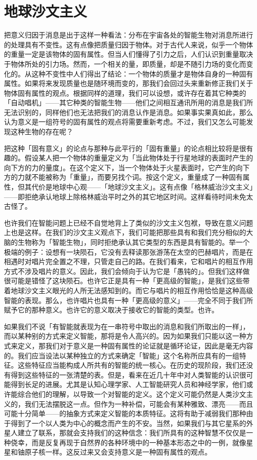 \documentclass[
  12pt,
  twoside,
  openright,
  oldfontcommands,
]{memoir}
\begin{document}
\section{地球沙文主义}

把意义归因于消息是出于这样一种看法：分布在宇宙各处的智能生物对消息所进行的处理具有不变性。这有点像把质量归因于物体。对于古代人来说，似乎一个物体的重量一定是该物体的固有属性。但当人们懂得了引力之后，人们认识到重量取决于物体所处的引力场。然而，一个相关的量，即质量，却是不随引力场的变化而变化的。从这种不变性中人们得出了结论：一个物体的质量才是物体自身的一种固有属性。如果将来发现质量也是随环境而变的，那我们会回过头来重新修正我们关于物体固有属性的观点。根据同样的道理，我们可以设想，或许存在着其它种类的「自动唱机」------其它种类的智能生物------他们之间相互通讯所用的消息是我们所无法识别的，同样他们也无法把我们的消息认作是消息。如果事实果真如此，那么认为意义是一组符号的固有属性的观点将需要重新考虑。不过，我们又怎么可能发现这种生物的存在呢？

把这种「固有意义」的论点与那种与此平行的「固有重量」的论点相比较将是很有趣的。假设某人把一个物体的重量定义为「当此物体处于行星地球的表面时产生的向下方的力的量度」。在这个定义下，当一个物体处于火星表面时，它产生的向下方的力就不能被称为「重量」，而要另找个词。按这个定义，重量成了一种固有属性，但其代价是地球中心观------「地球沙文主义」。这有点像「格林威治沙文主义」------即拒绝承认地球上除格林威治平时之外的其它地区时间。这样看待时间未免太古怪了。

也许我们在智能问题上已经不自觉地背上了类似的沙文主义包袱，导致在意义问题上也是这样。在我们的沙文主义观点下，我们可能把那些具有和我们充分相似的大脑的生物称为「智能生物」，同时拒绝承认其它类型的东西是具有智能的。举一个极端的例子：设想有一块陨石，它没有去释读那张游荡在太空的巴赫唱片，而是在相遇时对唱片完全置之不理，只管走自己的路。在我们看来，它和唱片的相互作用方式不涉及唱片的意义。因此，我们会倾向于认为它是「愚钝的」。但我们这样做很可能是错怪了这块陨石。也许它正是具有一种「更高级的智能」，是我们这些带着地球沙文主义眼光的人所无法感知到的。而它与唱片的相互作用恰恰是这种高级智能的表现。那么，也许唱片也具有一种「更高级的意义」------完全不同于我们所赋予它的那种意义。也许它的意义取决于接收它的智能的类型。也许。

如果我们不说「有智能就表现为在一串符号中取出的消息和我们所取出的一样」，而以某种别的方式来定义智能，那将是令人高兴的。因为如果我们只能以这一种方式来定义，那我们对于意义是一种固有属性的论证就是循环论证，因此是毫无内容的。我们应当设法以某种独立的方式来确定「智能」这个名称所应具有的一组特征。这些特征应当能构成人所共有的智能的统一核心。在历史的现阶段，我们还没有得到这些特征的一张清楚的表。但是，看来在近几十年中对人类智能的认识很可能得到长足的进展。尤其是认知心理学家、人工智能研究人员和神经学家，他们或许能综合他们的理解，以导致一个对智能的定义。这个定义可能仍然是人类沙文主义的，我们无法摆脱这一点。但作为一种补偿，可能会有某种雅致、漂亮------而且可能十分简单------的抽象方式来定义智能的本质特征。这将有助于减弱我们那种由于得到了一个以人类为中心的概念而产生的不安。当然，如果我们与其它星系的外星人建立了联系，那就会支持我们的这种信念：我们所具有的这种智慧不仅仅是一种侥幸，而是反复再现于自然界的各种环境中的一种基本形态之中的一例，就像星星和铀原子核一样。这反过来又会支持意义是一种固有属性的观点。
\end{document}
